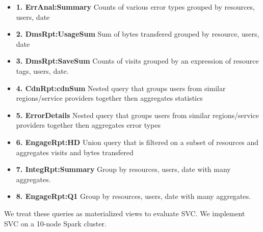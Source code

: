 \begin{itemize} 
\item \textbf{1. ErrAnal:Summary} Counts of various error types grouped by resources, users, date
\item \textbf{2. DmsRpt:UsageSum} Sum of bytes transfered grouped by resource, users, date
\item \textbf{3. DmsRpt:SaveSum} Counts of visits grouped by an expression of resource tags, users, date.
\item \textbf{4. CdnRpt:cdnSum} Nested query that groups users from similar regions/service providers together then aggregates statistics
\item \textbf{5. ErrorDetails} Nested query that groups users from similar regions/service providers together then aggregates error types
\item \textbf{6. EngageRpt:HD} Union query that is filtered on a subset of resources and aggregates visits and bytes transfered
\item \textbf{7. IntegRpt:Summary} Group by resources, users, date with many aggregates.
\item \textbf{8. EngageRpt:Q1} Group by resources, users, date with many aggregates.
\end{itemize}
We treat these queries as materialized views to evaluate SVC.
We implement SVC on a 10-node Spark cluster. 

